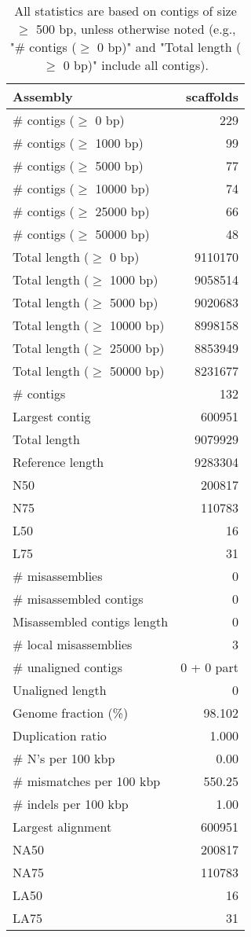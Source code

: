 \documentclass[12pt,a4paper]{article}
\begin{document}
\begin{table}[ht]
\begin{center}
\caption{All statistics are based on contigs of size $\geq$ 500 bp, unless otherwise noted (e.g., "\# contigs ($\geq$ 0 bp)" and "Total length ($\geq$ 0 bp)" include all contigs).}
\begin{tabular}{|l*{1}{|r}|}
\hline
Assembly & scaffolds \\ \hline
\# contigs ($\geq$ 0 bp) & 229 \\ \hline
\# contigs ($\geq$ 1000 bp) & 99 \\ \hline
\# contigs ($\geq$ 5000 bp) & 77 \\ \hline
\# contigs ($\geq$ 10000 bp) & 74 \\ \hline
\# contigs ($\geq$ 25000 bp) & 66 \\ \hline
\# contigs ($\geq$ 50000 bp) & 48 \\ \hline
Total length ($\geq$ 0 bp) & 9110170 \\ \hline
Total length ($\geq$ 1000 bp) & 9058514 \\ \hline
Total length ($\geq$ 5000 bp) & 9020683 \\ \hline
Total length ($\geq$ 10000 bp) & 8998158 \\ \hline
Total length ($\geq$ 25000 bp) & 8853949 \\ \hline
Total length ($\geq$ 50000 bp) & 8231677 \\ \hline
\# contigs & 132 \\ \hline
Largest contig & 600951 \\ \hline
Total length & 9079929 \\ \hline
Reference length & 9283304 \\ \hline
N50 & 200817 \\ \hline
N75 & 110783 \\ \hline
L50 & 16 \\ \hline
L75 & 31 \\ \hline
\# misassemblies & 0 \\ \hline
\# misassembled contigs & 0 \\ \hline
Misassembled contigs length & 0 \\ \hline
\# local misassemblies & 3 \\ \hline
\# unaligned contigs & 0 + 0 part \\ \hline
Unaligned length & 0 \\ \hline
Genome fraction (\%) & 98.102 \\ \hline
Duplication ratio & 1.000 \\ \hline
\# N's per 100 kbp & 0.00 \\ \hline
\# mismatches per 100 kbp & 550.25 \\ \hline
\# indels per 100 kbp & 1.00 \\ \hline
Largest alignment & 600951 \\ \hline
NA50 & 200817 \\ \hline
NA75 & 110783 \\ \hline
LA50 & 16 \\ \hline
LA75 & 31 \\ \hline
\end{tabular}
\end{center}
\end{table}
\end{document}
